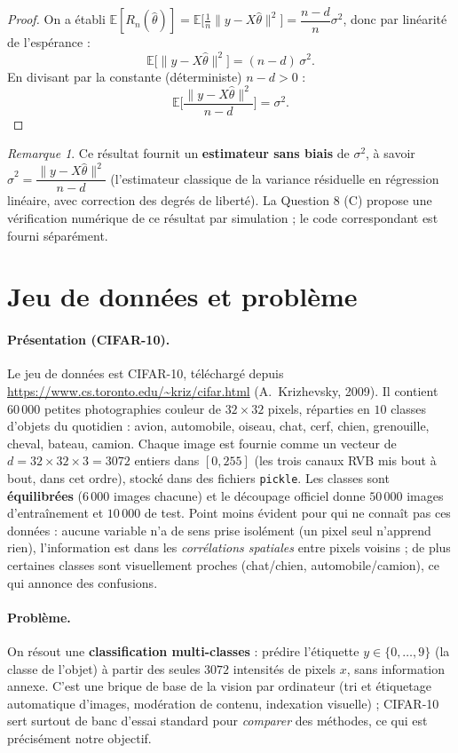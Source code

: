 \documentclass[11pt]{article}
\theoremstyle{remark}
\newtheorem*{remark}{Remarque}
\newcommand{\E}{\mathbb{E}}
\begin{document}
	\begin{proof}
		On a établi $\E[R_n(\hat\theta)] = \E\big[\tfrac1n\|y-X\hat\theta\|^2\big] = \dfrac{n-d}{n}\sigma^2$, donc par linéarité de l'espérance :
		\[
		\E\big[\|y-X\hat\theta\|^2\big] = (n-d)\,\sigma^2.
		\]
		En divisant par la constante (déterministe) $n-d > 0$ :
		\[
		\boxed{\E\Big[\frac{\|y-X\hat\theta\|^2}{n-d}\Big] = \sigma^2}.
		\]
	\end{proof}
	
	\begin{remark}
		Ce résultat fournit un \textbf{estimateur sans biais} de $\sigma^2$, à savoir $\hat\sigma^2 = \dfrac{\|y-X\hat\theta\|^2}{n-d}$ (l'estimateur classique de la variance résiduelle en régression linéaire, avec correction des degrés de liberté). La Question 8 (C) propose une vérification numérique de ce résultat par simulation ; le code correspondant est fourni séparément.
	\end{remark}

\section{Jeu de données et problème}
\paragraph{Présentation (CIFAR-10).} Le jeu de données est CIFAR-10, téléchargé
depuis \url{https://www.cs.toronto.edu/~kriz/cifar.html} (A.~Krizhevsky, 2009). Il
contient $60\,000$ petites photographies couleur de $32\times32$ pixels, réparties
en $10$ classes d'objets du quotidien : avion, automobile, oiseau, chat, cerf,
chien, grenouille, cheval, bateau, camion. Chaque image est fournie comme un
vecteur de $d=32\times32\times3=3072$ entiers dans $[0,255]$ (les trois canaux RVB
mis bout à bout, dans cet ordre), stocké dans des fichiers \texttt{pickle}. Les
classes sont \textbf{équilibrées} ($6\,000$ images chacune) et le découpage
officiel donne $50\,000$ images d'entraînement et $10\,000$ de test. Point moins
évident pour qui ne connaît pas ces données : aucune variable n'a de sens prise
isolément (un pixel seul n'apprend rien), l'information est dans les
\emph{corrélations spatiales} entre pixels voisins ; de plus certaines classes sont
visuellement proches (chat/chien, automobile/camion), ce qui annonce des confusions.

\paragraph{Problème.} On résout une \textbf{classification multi-classes} :
prédire l'étiquette $y\in\{0,\dots,9\}$ (la classe de l'objet) à partir des seules
$3072$ intensités de pixels $x$, sans information annexe. C'est une brique de base
de la vision par ordinateur (tri et étiquetage automatique d'images, modération de
contenu, indexation visuelle) ; CIFAR-10 sert surtout de banc d'essai standard pour
\emph{comparer} des méthodes, ce qui est précisément notre objectif.
\end{document}
